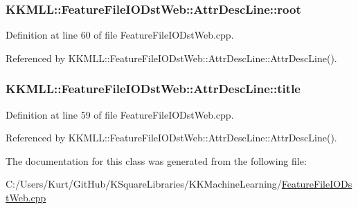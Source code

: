 \subsubsection[{\texorpdfstring{root}{root}}]{ K\+K\+M\+L\+L\+::\+Feature\+File\+I\+O\+Dst\+Web\+::\+Attr\+Desc\+Line\+::root}\hypertarget{class_feature_file_i_o_dst_web_1_1_attr_desc_line_a1b113dcf30d429e6a0db6042df2e9b51}{}\label{class_feature_file_i_o_dst_web_1_1_attr_desc_line_a1b113dcf30d429e6a0db6042df2e9b51}


Definition at line 60 of file Feature\+File\+I\+O\+Dst\+Web.\+cpp.



Referenced by K\+K\+M\+L\+L\+::\+Feature\+File\+I\+O\+Dst\+Web\+::\+Attr\+Desc\+Line\+::\+Attr\+Desc\+Line().

\subsubsection[{\texorpdfstring{title}{title}}]{ K\+K\+M\+L\+L\+::\+Feature\+File\+I\+O\+Dst\+Web\+::\+Attr\+Desc\+Line\+::title}\hypertarget{class_feature_file_i_o_dst_web_1_1_attr_desc_line_a04afb7863f4c0ebd681c503e42a52c3b}{}\label{class_feature_file_i_o_dst_web_1_1_attr_desc_line_a04afb7863f4c0ebd681c503e42a52c3b}


Definition at line 59 of file Feature\+File\+I\+O\+Dst\+Web.\+cpp.



Referenced by K\+K\+M\+L\+L\+::\+Feature\+File\+I\+O\+Dst\+Web\+::\+Attr\+Desc\+Line\+::\+Attr\+Desc\+Line().



The documentation for this class was generated from the following file\+:\begin{DoxyCompactItemize}
\item 
C\+:/\+Users/\+Kurt/\+Git\+Hub/\+K\+Square\+Libraries/\+K\+K\+Machine\+Learning/\hyperlink{_feature_file_i_o_dst_web_8cpp}{Feature\+File\+I\+O\+Dst\+Web.\+cpp}\end{DoxyCompactItemize}
